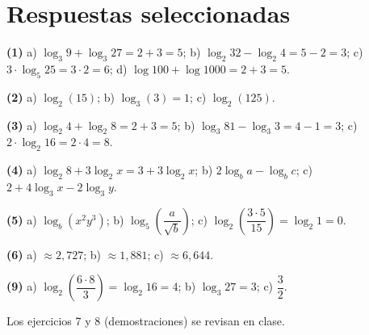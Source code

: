 \documentclass[11pt,a4paper]{article}
\begin{document}
\newpage

\section*{Respuestas seleccionadas}

\begin{tcolorbox}[propiedad, title=Soluciones]
\textbf{(1)} a) $\log_3 9 + \log_3 27 = 2 + 3 = 5$; \; b) $\log_2 32 - \log_2 4 = 5 - 2 = 3$; \; c) $3 \cdot \log_5 25 = 3 \cdot 2 = 6$; \; d) $\log 100 + \log 1000 = 2 + 3 = 5$.

\medskip
\textbf{(2)} a) $\log_2(15)$; \; b) $\log_3(3) = 1$; \; c) $\log_2(125)$.

\medskip
\textbf{(3)} a) $\log_2 4 + \log_2 8 = 2 + 3 = 5$; \; b) $\log_3 81 - \log_3 3 = 4 - 1 = 3$; \; c) $2 \cdot \log_2 16 = 2 \cdot 4 = 8$.

\medskip
\textbf{(4)} a) $\log_2 8 + 3\log_2 x = 3 + 3\log_2 x$; \; b) $2\log_b a - \log_b c$; \; c) $2 + 4\log_3 x - 2\log_3 y$.

\medskip
\textbf{(5)} a) $\log_b(x^{2}y^{3})$; \; b) $\log_5\!\left(\dfrac{a}{\sqrt{b}}\right)$; \; c) $\log_2\!\left(\dfrac{3 \cdot 5}{15}\right) = \log_2 1 = 0$.

\medskip
\textbf{(6)} a) $\approx 2{,}727$; \; b) $\approx 1{,}881$; \; c) $\approx 6{,}644$.

\medskip
\textbf{(9)} a) $\log_2\!\left(\dfrac{6 \cdot 8}{3}\right) = \log_2 16 = 4$; \; b) $\log_3 27 = 3$; \; c) $\dfrac{3}{2}$.
\end{tcolorbox}

\begin{tcolorbox}[recuerda]
Los ejercicios 7 y 8 (demostraciones) se revisan en clase.
\end{tcolorbox}
\end{document}
